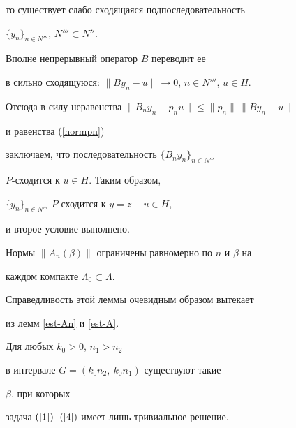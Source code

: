 \begin{pf}
то существует слабо сходящаяся подпоследовательность 


$\{y_n\}_{n \in N'''}$, $N'''\subset N''$. 


Вполне непрерывный оператор $B$ переводит ее


в сильно сходящуюся: $\|By_n-u\|\to 0$, $n\in N'''$, $u\in H$. 


Отсюда в силу неравенства $\|B_ny_n-p_nu\|\le \|p_n\|\,\|By_n-u\|$


и равенства (\ref{normpn})


заключаем, что последовательность $\{B_ny_n \}_{n\in N'''}$\;


$P$-сходится к $u\in H$. Таким образом,


$\{y_n \}_{n\in N'''}$\; $P$-сходится к $y=z-u\in H$,


и второе условие выполнено.


\end{pf}





\begin{lem}


\label{Cond5}


Нормы $\|A_n(\beta)\|$ ограничены равномерно по $n$ и $\beta$ на


каждом компакте $\Lambda_0\subset \Lambda$.


\end{lem}





Справедливость этой леммы очевидным образом вытекает


из лемм \ref{est-An} и \ref{est-A}. 





\begin{lem}


\label{dad}


Для любых $k_0 > 0$, $n_1 > n_2$ 


в интервале $G=(k_0n_2,\ k_0n_1)$ существуют такие 


$\beta$, при которых 


задача $(\ref{1})$--$(\ref{4})$ имеет лишь тривиальное решение.


\end{lem}






